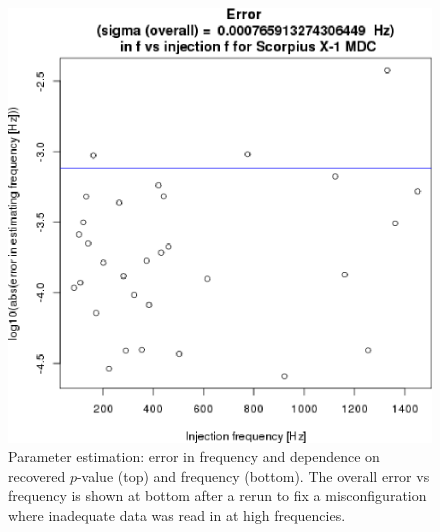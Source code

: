 \begin{figure}
\begin{center}
\includegraphics[trim=0 0 0 10, clip, width=0.52\paperwidth,height=0.36\paperheight]{plots/ErrorFvsF-overall.eps}
\caption{Parameter estimation: error in frequency and dependence on recovered $p$-value (top) and frequency (bottom). 
The overall error vs frequency is shown at bottom after a rerun to fix a misconfiguration where inadequate data was read in at high frequencies.
\label{fig:errorf}}
\end{center}
\end{figure}


